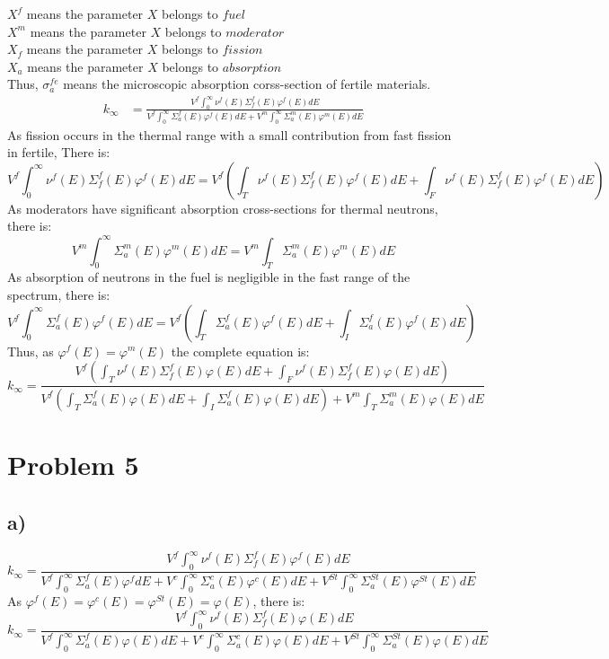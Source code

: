 \documentclass{article}
\begin{document}
\(X^f\) means the parameter \(X\) belongs to \(fuel\)\\
\(X^m\) means the parameter \(X\) belongs to \(moderator\)\\
\(X_f\) means the parameter \(X\) belongs to \(fission\)\\
\(X_a\) means the parameter \(X\) belongs to \(absorption\)\\
Thus, \(\sigma^{fe}_a\) means the microscopic absorption corss-section of fertile materials.\\ 
\begin{align*}
     k_\infty &= \frac{V^f\int^\infty_0 \nu^f(E)\Sigma^f_f(E)\varphi^f(E)dE}{V^f\int^\infty_0\Sigma_a^f(E)\varphi^f(E)dE+V^m\int^\infty_0\Sigma_a^m(E)\varphi^m(E)dE }
\end{align*}
As fission occurs in the thermal range with a small contribution from fast fission in fertile, There is:\\
\[V^f\int^\infty_0 \nu^f(E)\Sigma^f_f(E)\varphi^f(E)dE=V^f\left(\int_T \nu^f(E)\Sigma^f_f(E)\varphi^f(E)dE+\int_F \nu^f(E)\Sigma^f_f(E)\varphi^f(E)dE\right)\]
As moderators have significant absorption cross-sections for thermal neutrons, there is:\\
\[V^m\int^\infty_0\Sigma_a^m(E)\varphi^m(E)dE=V^m\int_T\Sigma_a^m(E)\varphi^m(E)dE\] 
As absorption of neutrons in the fuel is negligible in the fast range of the spectrum, there is:\\
\[V^f\int^\infty_0\Sigma_a^f(E)\varphi^f(E)dE=V^f\left(\int_T\Sigma_a^f(E)\varphi^f(E)dE+\int_I\Sigma_a^f(E)\varphi^f(E)dE\right)\]
Thus, as \(\varphi^f(E)=\varphi^m(E)\) the complete equation is:\\
\[k_\infty = \frac{V^f\left(\int_T \nu^f(E)\Sigma^f_f(E)\varphi(E)dE+\int_F \nu^f(E)\Sigma^f_f(E)\varphi(E)dE\right)}{V^f\left(\int_T\Sigma_a^f(E)\varphi(E) dE+\int_I\Sigma_a^f(E)\varphi(E) dE\right)+V^m\int_T\Sigma_a^m(E)\varphi (E)dE}\]
\section*{Problem 5}
\subsection*{a)}
\[k_\infty = \frac{V^f\int^\infty_0 \nu^f(E)\Sigma^f_f(E)\varphi^f(E)dE}{V^f\int^\infty_0\Sigma_a^f(E)\varphi^fdE+V^c\int^\infty_0\Sigma_a^c(E)\varphi^c(E)dE+V^{St}\int^\infty_0\Sigma_a^{St}(E)\varphi^{St}(E)dE}\]
As \(\varphi^f(E)=\varphi^c(E)=\varphi^{St}(E)=\varphi(E)\), there is:
\[k_\infty = \frac{V^f\int^\infty_0 \nu^f(E)\Sigma^f_f(E)\varphi(E)dE}{V^f\int^\infty_0\Sigma_a^f(E)\varphi(E)dE+V^c\int^\infty_0\Sigma_a^c(E)\varphi(E)dE+V^{St}\int^\infty_0\Sigma_a^{St}(E)\varphi(E)dE}\]
\end{document}
